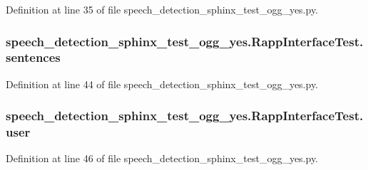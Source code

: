 Definition at line 35 of file speech\-\_\-detection\-\_\-sphinx\-\_\-test\-\_\-ogg\-\_\-yes.\-py.

\hypertarget{classspeech__detection__sphinx__test__ogg__yes_1_1RappInterfaceTest_a4b01325fe4e37b0ec1ac9ed69bcc819a}{
\subsubsection[{sentences}]{\setlength{\rightskip}{0pt plus 5cm}speech\-\_\-detection\-\_\-sphinx\-\_\-test\-\_\-ogg\-\_\-yes.\-Rapp\-Interface\-Test.\-sentences}}\label{classspeech__detection__sphinx__test__ogg__yes_1_1RappInterfaceTest_a4b01325fe4e37b0ec1ac9ed69bcc819a}


Definition at line 44 of file speech\-\_\-detection\-\_\-sphinx\-\_\-test\-\_\-ogg\-\_\-yes.\-py.

\hypertarget{classspeech__detection__sphinx__test__ogg__yes_1_1RappInterfaceTest_a84bff0e5fdaf8c8210bfaa4debe7fa73}{
\subsubsection[{user}]{\setlength{\rightskip}{0pt plus 5cm}speech\-\_\-detection\-\_\-sphinx\-\_\-test\-\_\-ogg\-\_\-yes.\-Rapp\-Interface\-Test.\-user}}\label{classspeech__detection__sphinx__test__ogg__yes_1_1RappInterfaceTest_a84bff0e5fdaf8c8210bfaa4debe7fa73}


Definition at line 46 of file speech\-\_\-detection\-\_\-sphinx\-\_\-test\-\_\-ogg\-\_\-yes.\-py.

